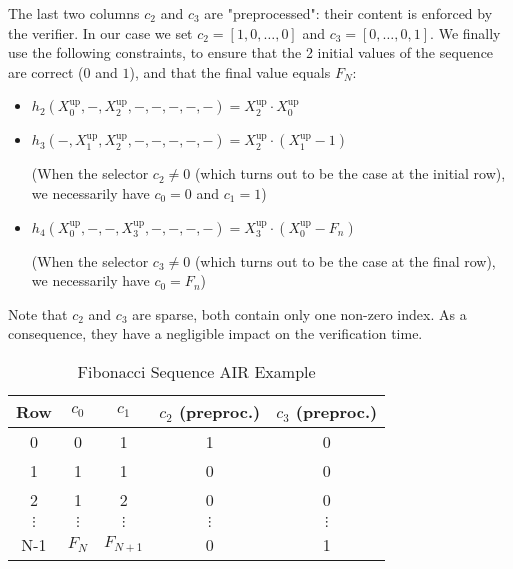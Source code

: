 \documentclass{article}
\begin{document}
 The last two columns $c_2$ and $c_3$ are "preprocessed": their content is enforced by the verifier. In our case we set $c_2 = [1, 0, \dots, 0]$ and $c_3 = [0, \dots, 0, 1]$. We finally use the following constraints, to ensure that the 2 initial values of the sequence are correct ($0$ and $1$), and that the final value equals $F_N$:

 \begin{itemize}
    \item $h_2(X_0^{\text{up}}, -, X_2^{\text{up}}, -, -, -, -, -) =   X_2^{\text{up}} \cdot X_0^{\text{up}}$ 
     \item $h_3(-, X_1^{\text{up}}, X_2^{\text{up}}, -, -, -, -, -) =  X_2^{\text{up}} \cdot (X_1^{\text{up}} - 1) $ 

(When the selector $c_2 \neq 0$ (which turns out to be the case at the initial row), we necessarily have $c_0 = 0$ and $c_1 = 1$)

 \item $h_4(X_0^{\text{up}}, -, -, X_3^{\text{up}}, -, -, -, -) = X_3^{\text{up}} \cdot (X_0^{\text{up}} - F_n)$ 

(When the selector $c_3 \neq 0$ (which turns out to be the case at the final row), we necessarily have $c_0 = F_n$)

\end{itemize}

 Note that $c_2$ and $c_3$ are sparse, both contain only one non-zero index. As a consequence, they have a negligible impact on the verification time.

\begin{table}[h!]
\centering
\caption{Fibonacci Sequence AIR Example}
\begin{tabular}{ccccc}
\toprule
Row & $c_0$ & $c_1$ & $c_2$ (preproc.) & $c_3$ (preproc.) \\
\midrule
0 & \cellcolor{blue!10}0 & \cellcolor{blue!10}1 & \cellcolor{orange!10}1 & \cellcolor{orange!10}0 \\
1 & \cellcolor{blue!10}1 & \cellcolor{blue!10}1 & \cellcolor{orange!10}0 & \cellcolor{orange!10}0 \\
2 & \cellcolor{blue!10}1 & \cellcolor{blue!10}2 & \cellcolor{orange!10}0 & \cellcolor{orange!10}0 \\
$\vdots$ & $\vdots$ & $\vdots$ & $\vdots$ & $\vdots$ \\
N-1 & \cellcolor{blue!10}$F_N$ & \cellcolor{blue!10}$F_{N+1}$ & \cellcolor{orange!10}0 & \cellcolor{orange!10}1 \\
\bottomrule
\end{tabular}

\vspace{1em}
\end{table}
\end{document}
